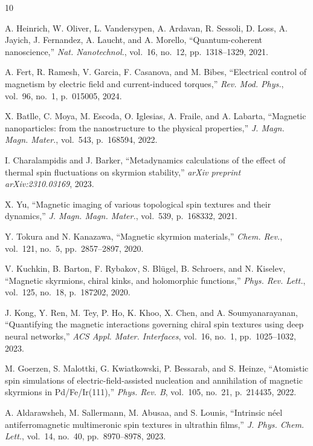 \documentclass[final,5p,times,twocolumn]{elsarticle}
\begin{document}
\begin{thebibliography}{10}

A. Heinrich, W. Oliver, L. Vandersypen, A. Ardavan, R. Sessoli, D. Loss, A. Jayich, J. Fernandez, A. Laucht, and A. Morello, ``Quantum-coherent nanoscience,'' {\em Nat. Nanotechnol.}, vol.~16, no.~12, pp.~1318--1329, 2021.

A. Fert, R. Ramesh, V. Garcia, F. Casanova, and M. Bibes, ``Electrical control of magnetism by electric field and current-induced torques,'' {\em Rev. Mod. Phys.}, vol.~96, no.~1, p.~015005, 2024.

X. Batlle, C. Moya, M. Escoda, O. Iglesias, A. Fraile, and A. Labarta, ``Magnetic nanoparticles: from the nanostructure to the physical properties,'' {\em J. Magn. Magn. Mater.}, vol.~543, p.~168594, 2022.

I. Charalampidis and J. Barker, ``Metadynamics calculations of the effect of thermal spin fluctuations on skyrmion stability,'' {\em arXiv preprint arXiv:2310.03169}, 2023.

X. Yu, ``Magnetic imaging of various topological spin textures and their dynamics,'' {\em J. Magn. Magn. Mater.}, vol.~539, p.~168332, 2021.

Y. Tokura and N. Kanazawa, ``Magnetic skyrmion materials,'' {\em Chem. Rev.}, vol.~121, no.~5, pp.~2857--2897, 2020.

V. Kuchkin, B. Barton, F. Rybakov, S. Bl{\"u}gel, B. Schroers, and N. Kiselev, ``Magnetic skyrmions, chiral kinks, and holomorphic functions,'' {\em Phys. Rev. Lett.}, vol.~125, no.~18, p.~187202, 2020.

J. Kong, Y. Ren, M. Tey, P. Ho, K. Khoo, X. Chen, and A. Soumyanarayanan, ``Quantifying the magnetic interactions governing chiral spin textures using deep neural networks,'' {\em ACS Appl. Mater. Interfaces}, vol.~16, no.~1, pp.~1025--1032, 2023.

M. Goerzen, S. Malottki, G. Kwiatkowski, P. Bessarab, and S. Heinze, ``Atomistic spin simulations of electric-field-assisted nucleation and annihilation of magnetic skyrmions in Pd/Fe/Ir(111),'' {\em Phys. Rev. B}, vol.~105, no.~21, p.~214435, 2022.

A. Aldarawsheh, M. Sallermann, M. Abusaa, and S. Lounis, ``Intrinsic n{\'e}el antiferromagnetic multimeronic spin textures in ultrathin films,'' {\em J. Phys. Chem. Lett.}, vol.~14, no.~40, pp.~8970--8978, 2023.


\end{thebibliography}
\end{document}
